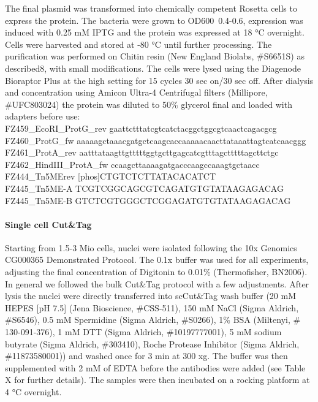 The final plasmid was transformed into chemically competent Rosetta cells to express the protein. The bacteria were grown to OD600~0.4-0.6, expression was induced with 0.25 mM IPTG and the protein was expressed at 18 °C overnight. Cells were harvested and stored at -80 °C until further processing. The purification was performed on Chitin resin (New England Biolabs, \#S6651S) as described8, with small modifications. The cells were lysed using the Diagenode Bioraptor Plus at the high setting for 15 cycles 30 sec on/30 sec off.
After dialysis and concentration using Amicon Ultra-4 Centrifugal filters (Millipore, \#UFC803024) the protein was diluted to 50\% glycerol final and loaded with adapters before use: \\
FZ459\_EcoRI\_ProtG\_rev	gaattctttatcgtcatctacggctggcgtcaactcagacgcg \\
FZ460\_ProtG\_fw	aaaaagctaaacgatgctcaagcaccaaaaacaacttataaattagtcatcaacggg \\
FZ461\_ProtA\_rev	aatttataagttgtttttggtgcttgagcatcgtttagctttttagcttctgc \\
FZ462\_HindIII\_ProtA\_fw	ccaagcttaaaagatgacccaagccaaagtgctaacc \\
FZ444\_Tn5MErev	[phos]CTGTCTCTTATACACATCT \\
FZ445\_Tn5ME-A	TCGTCGGCAGCGTCAGATGTGTATAAGAGACAG \\
FZ445\_Tn5ME-B	GTCTCGTGGGCTCGGAGATGTGTATAAGAGACAG \\

\paragraph{Single cell Cut\&Tag}
Starting from 1.5-3 Mio cells, nuclei were isolated following the 10x Genomics CG000365 Demonstrated Protocol. The 0.1x buffer was used for all experiments, adjusting the final concentration of Digitonin to 0.01\% (Thermofisher, BN2006). In general we followed the bulk Cut\&Tag protocol with a few adjustments. 
After lysis the nuclei were directly transferred into scCut\&Tag wash buffer (20 mM HEPES [pH 7.5] (Jena Bioscience, \#CSS-511), 150 mM NaCl (Sigma Aldrich, \#S6546), 0.5 mM Spermidine (Sigma Aldrich, \#S0266), 1\% BSA (Miltenyi, \# 130-091-376), 1 mM DTT (Sigma Aldrich, \#10197777001), 5 mM sodium butyrate (Sigma Aldrich, \#303410), Roche Protease Inhibitor (Sigma Aldrich, \#11873580001)) and washed once for 3 min at 300 xg. The buffer was then supplemented with 2 mM of EDTA before the antibodies were added (see Table X for further details). The samples were then incubated on a rocking platform at 4 °C overnight. 

